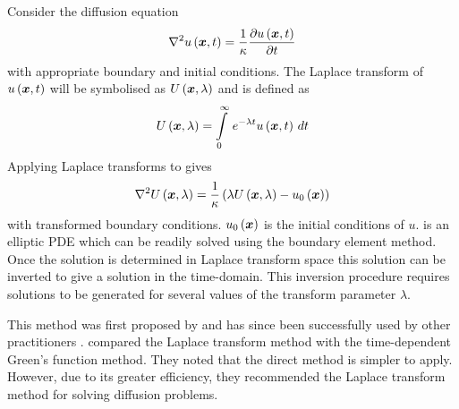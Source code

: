 Consider the diffusion equation
\begin{equation}
  \laplacian{\fnof{u}{\vect{x},t}} = \dfrac{1}{\kappa}
  \delby{\fnof{u}{\vect{x},t}}{t}
\label{eq:lap_diff}
\end{equation}
with appropriate boundary and initial conditions.  The Laplace transform
of $\fnof{u}{\vect{x},t}$ will be symbolised as $\fnof{U}{\vect{x},\lambda}$ and is
defined as
\begin{equation}
  \fnof{U}{\vect{x},\lambda} = \gint{0}{\infty}{e^{-\lambda t}
  \fnof{u}{\vect{x},t}}{t}
\end{equation}
Applying Laplace transforms to  gives
\begin{equation}
  \laplacian{\fnof{U}{\vect{x},\lambda}} = \dfrac{1}{\kappa} \pbrac{\lambda
    \fnof{U}{\vect{x},\lambda} - \fnof{u_{0}}{\vect{x}}}
\label{eq:laptrans}
\end{equation}
with transformed boundary conditions. $\fnof{u_{0}}{\vect{x}}$ is the initial
conditions of $u$.  is an elliptic PDE which can be
readily solved using the boundary element method.  Once the solution is
determined in Laplace transform space this solution can be inverted to give
a solution in the time-domain. This inversion procedure requires solutions
to be generated for several values of the transform parameter $\lambda$.

This method was first proposed by  and has since
been successfully used by other practitioners \cite{moridis:1991}
\cite{zhu:1994}.   compared the Laplace transform
method with the time-dependent Green's function method. They noted that the
direct method is simpler to apply.  However, due to its greater efficiency,
they recommended the Laplace transform method for solving diffusion
problems.

